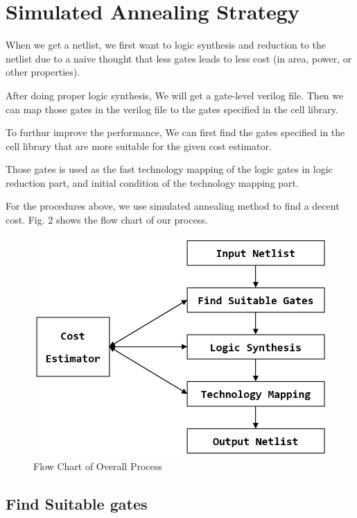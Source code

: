 \documentclass[conference]{IEEEtran}
\begin{document}
\section{Simulated Annealing Strategy}

When we get a netlist, we first want to logic synthesis and reduction to the netlist due to a naive thought that less gates leads to less cost (in area, power, or other properties). 

After doing proper logic synthesis, We will get a gate-level verilog file. Then we can map those gates in the verilog file to the gates specified in the cell library. 

To furthur improve the performance, We can first find the gates specified in the cell library that are more suitable for the given cost estimator. 

Those gates is used as the fast technology mapping of the logic gates in logic reduction part, and initial condition of the technology mapping part.

For the procedures above, we use simulated annealing method to find a decent cost. Fig. 2 shows the flow chart of our process.

\begin{figure}
    \centering
    \includegraphics[width=1\linewidth]{flow chart.png}
    \caption{Flow Chart of Overall Process}
    \label{fig:enter-label}
\end{figure}

\subsection{Find Suitable gates}
\end{document}
